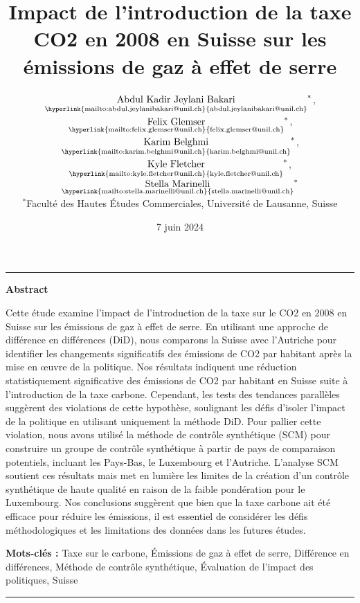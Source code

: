 \documentclass[7pt]{article}
\title{\Large \textbf{Impact de l'introduction de la taxe CO2 en 2008 en Suisse sur les émissions de gaz à effet de serre}}
\author{\small
    $\underset{\text{\hyperlink{mailto:abdul.jeylanibakari@unil.ch}{abdul.jeylanibakari@unil.ch}}}{\text{Abdul Kadir Jeylani Bakari}}^*$,\; \quad
    $\underset{\text{\hyperlink{mailto:felix.glemser@unil.ch}{felix.glemser@unil.ch}}}{\text{Felix Glemser}}^*$,\; \quad
    $\underset{\text{\hyperlink{mailto:karim.belghmi@unil.ch}{karim.belghmi@unil.ch}}}{\text{Karim Belghmi}}^*$,\; \quad
    $\underset{\text{\hyperlink{mailto:kyle.fletcher@unil.ch}{kyle.fletcher@unil.ch}}}{\text{Kyle Fletcher}}^*$,\; \quad
    $\underset{\text{\hyperlink{mailto:stella.marinelli@unil.ch}{stella.marinelli@unil.ch}}}{\text{Stella Marinelli}}^*$
    \\
{\footnotesize $^*$Faculté des Hautes Études Commerciales, Université de Lausanne, Suisse}
}
\date{\small 7 juin 2024}
\begin{document}

\begin{titlingpage}
    \maketitle
\vspace*{3.12345cm}
\hrule
\vspace*{0.1cm}
\textbf{Abstract} 


\footnotesize{Cette étude examine l'impact de l'introduction de la taxe sur le CO2 en 2008 en Suisse sur les émissions de gaz à effet de serre. En utilisant une approche de différence en différences (DiD), nous comparons la Suisse avec l'Autriche pour identifier les changements significatifs des émissions de CO2 par habitant après la mise en œuvre de la politique. Nos résultats indiquent une réduction statistiquement significative des émissions de CO2 par habitant en Suisse suite à l'introduction de la taxe carbone. Cependant, les tests des tendances parallèles suggèrent des violations de cette hypothèse, soulignant les défis d'isoler l'impact de la politique en utilisant uniquement la méthode DiD. Pour pallier cette violation, nous avons utilisé la méthode de contrôle synthétique (SCM) pour construire un groupe de contrôle synthétique à partir de pays de comparaison potentiels, incluant les Pays-Bas, le Luxembourg et l'Autriche. L'analyse SCM soutient ces résultats mais met en lumière les limites de la création d'un contrôle synthétique de haute qualité en raison de la faible pondération pour le Luxembourg. Nos conclusions suggèrent que bien que la taxe carbone ait été efficace pour réduire les émissions, il est essentiel de considérer les défis méthodologiques et les limitations des données dans les futures études.}\\



\vspace*{0.1cm}

\textbf{Mots-clés :} Taxe sur le carbone, Émissions de gaz à effet de serre, Différence en différences, Méthode de contrôle synthétique, Évaluation de l'impact des politiques, Suisse
\vspace*{0.1cm}
\hrule

\end{titlingpage}
\end{document}
